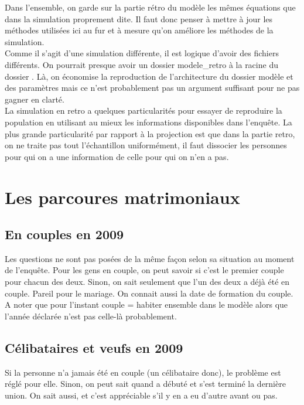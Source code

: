 

Dans l'ensemble, on garde sur la partie rétro du modèle les mêmes équations que dans la simulation proprement dite. 
Il faut donc penser à mettre à jour les méthodes utilisées ici au fur et à mesure qu'on améliore les méthodes de la simulation.\\

Comme il s'agit d'une simulation différente, il est logique d'avoir des fichiers différents.
On pourrait presque avoir un dossier modele_retro à la racine du dossier \txl .
Là, on économise la reproduction de l'architecture du dossier modèle et des paramètres mais ce n'est probablement pas un argument suffisant pour ne pas gagner en clarté. \\

La simulation en retro a quelques particularités pour essayer de reproduire la population en utilisant au mieux les informations disponibles dans l'enquête.
La plus grande particularité par rapport à la projection est que dans la partie retro, on ne traite pas tout l'échantillon uniformément, il faut dissocier les personnes pour qui on a une information de celle pour qui on n'en a pas. 

\section{Les parcoures matrimoniaux}

\subsection{En couples en 2009}
Les questions ne sont pas posées de la même façon selon sa situation au moment de l'enquête. 
Pour les gens en couple, on peut savoir si c'est le premier couple pour chacun des deux. 
Sinon, on sait seulement que l'un des deux a déjà été en couple. 
Pareil pour le mariage. 
On connait aussi la date de formation du couple. 
A noter que pour l'instant couple = habiter ensemble dans le modèle alors que l'année déclarée n'est pas celle-là probablement. 

\subsection{Célibataires et veufs en 2009}
Si la personne n'a jamais été en couple (un célibataire donc), le problème est réglé pour elle. 
Sinon, on peut sait quand a débuté et s'est terminé la dernière union. 
On sait aussi, et c'est appréciable s'il y en a eu d'autre avant ou pas. 


